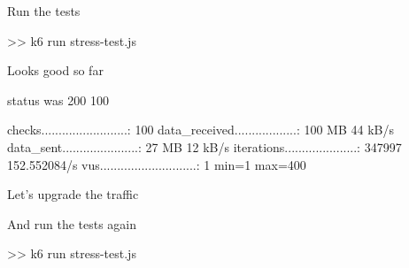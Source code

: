 \documentclass{slide}
\begin{document}


\begin{frame}[fragile]
\footnotesize
{}
\end{frame}

\begin{frame}[fragile]
\par\bigskip
{\color{primary}Run the tests}
\begin{code}[language=shell]{}
>> k6 run stress-test.js
\end{code}
\end{frame}

\begin{frame}[fragile]
\par\bigskip
{\color{primary}Looks good so far}
\begin{code}[language=shell]{}
 status was 200
  100%

checks.........................: 100%
data_received..................: 100 MB 44 kB/s
data_sent......................: 27 MB  12 kB/s
iterations.....................: 347997 152.552084/s
vus............................: 1    min=1    max=400 
\end{code}
\end{frame}

\begin{frame}[fragile]
\par\bigskip
{\color{primary}Let's upgrade the traffic}
\footnotesize
{}
\end{frame}

\begin{frame}[fragile]
\par\bigskip
{\color{primary}And run the tests again}
\begin{code}[language=shell]{}
>> k6 run stress-test.js
\end{code}
\end{frame}
\end{document}
